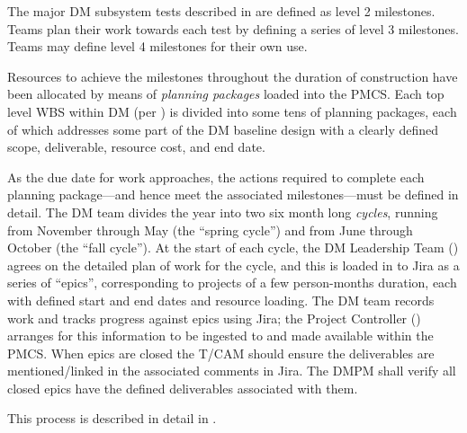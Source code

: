 The major DM subsystem tests described in  are defined as level 2 milestones.
Teams plan their work towards each test by defining a series of level 3 milestones.
Teams may define level 4 milestones for their own use.

Resources to achieve the milestones throughout the duration of construction have been allocated by means of \textit{planning packages} loaded into the PMCS.
Each top level WBS within DM (per ) is divided into some tens of planning packages, each of which addresses some part of the DM baseline design with a clearly defined scope, deliverable, resource cost, and end date.

As the due date for work approaches, the actions required to complete each planning package---and hence meet the associated milestones---must be defined in detail.
The DM team divides the year into two six month long \textit{cycles}, running from November through May (the ``spring cycle'') and from June through October (the ``fall cycle'').
At the start of each cycle, the DM Leadership Team () agrees on the detailed plan of work for the cycle, and this is loaded in to Jira as a series of ``epics'', corresponding to projects of a few person-months duration, each with defined start and end dates and resource loading.
The DM team records work and tracks progress against epics using Jira; the Project Controller () arranges for this information to be ingested to and made available within the PMCS.
When epics are closed the T/CAM should ensure the deliverables are mentioned/linked in the associated comments in Jira. The DMPM shall verify all closed epics have the defined deliverables associated with them.

This process is described in detail in .
